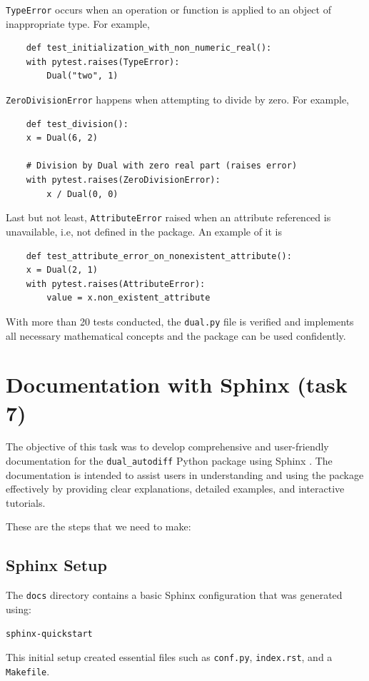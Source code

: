 \documentclass[12.5pt]{article}
\begin{document}
\texttt{TypeError} occurs when an operation or function is applied to an object of inappropriate type. For example, 
\begin{lstlisting}
    def test_initialization_with_non_numeric_real():
    with pytest.raises(TypeError):
        Dual("two", 1)
\end{lstlisting}
\texttt{ZeroDivisionError} happens when attempting to divide by zero. For example,
\begin{lstlisting}
    def test_division():
    x = Dual(6, 2)

    # Division by Dual with zero real part (raises error)
    with pytest.raises(ZeroDivisionError):
        x / Dual(0, 0)
\end{lstlisting}
Last but not least, \texttt{AttributeError} raised when an attribute referenced is unavailable, i.e, not defined in the package. An example of it is
\begin{lstlisting}
    def test_attribute_error_on_nonexistent_attribute():
    x = Dual(2, 1)
    with pytest.raises(AttributeError):
        value = x.non_existent_attribute
\end{lstlisting}

With more than 20 tests conducted, the \texttt{dual.py} file is verified and implements all necessary mathematical concepts and the package can be used confidently.

\section{Documentation with Sphinx (task 7)}
The objective of this task was to develop comprehensive and user-friendly documentation for the \texttt{dual\_autodiff} Python package using Sphinx \cite{sphinx}. The documentation is intended to assist users in understanding and using the package effectively by providing clear explanations, detailed examples, and interactive tutorials.

These are the steps that we need to make:
\subsection*{Sphinx Setup}

The \texttt{docs} directory contains a basic Sphinx configuration that was generated using:

\begin{lstlisting}[language=bash]
sphinx-quickstart
\end{lstlisting}

This initial setup created essential files such as \texttt{conf.py}, \texttt{index.rst}, and a \texttt{Makefile}.
\end{document}
